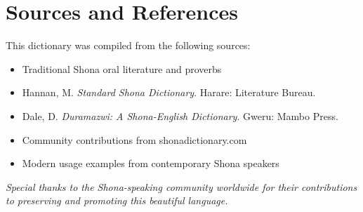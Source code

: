 \documentclass[10pt,twoside]{book}
\begin{document}
\chapter*{Sources and References}

This dictionary was compiled from the following sources:

\begin{itemize}
\item Traditional Shona oral literature and proverbs
\item Hannan, M. \textit{Standard Shona Dictionary}. Harare: Literature Bureau.
\item Dale, D. \textit{Duramazwi: A Shona-English Dictionary}. Gweru: Mambo Press.
\item Community contributions from shonadictionary.com
\item Modern usage examples from contemporary Shona speakers
\end{itemize}

\vspace{1cm}
\textit{Special thanks to the Shona-speaking community worldwide for their contributions to preserving and promoting this beautiful language.}
\end{document}
